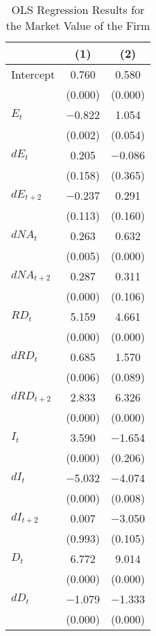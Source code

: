 {
\begin{longtable}{l*{2}{c}}
\caption{OLS Regression Results for the Market Value of the Firm \label{tab:6}}\\
\toprule\endfirsthead\midrule\endhead\midrule\endfoot\endlastfoot
&\multicolumn{1}{c}{(1)}&\multicolumn{1}{c}{(2)}\\
\midrule
Intercept   &       0.760&       0.580\\
&     (0.000)&     (0.000)\\
\addlinespace
$ E_{t}$    &    $-$0.822&       1.054\\
&     (0.002)&     (0.054)\\
\addlinespace
$ dE_{t}$   &       0.205&    $-$0.086\\
&     (0.158)&     (0.365)\\
\addlinespace
$ dE_{t+2}$ &    $-$0.237&       0.291\\
&     (0.113)&     (0.160)\\
\addlinespace
$ dNA_{t}$  &       0.263&       0.632\\
&     (0.005)&     (0.000)\\
\addlinespace
$ dNA_{t+2}$&       0.287&       0.311\\
&     (0.000)&     (0.106)\\
\addlinespace
$ RD_{t}$   &       5.159&       4.661\\
&     (0.000)&     (0.000)\\
\addlinespace
$ dRD_{t}$  &       0.685&       1.570\\
&     (0.006)&     (0.089)\\
\addlinespace
$ dRD_{t+2}$&       2.833&       6.326\\
&     (0.000)&     (0.000)\\
\addlinespace
$ I_{t}$    &       3.590&    $-$1.654\\
&     (0.000)&     (0.206)\\
\addlinespace
$ dI_{t}$   &    $-$5.032&    $-$4.074\\
&     (0.000)&     (0.008)\\
\addlinespace
$ dI_{t+2}$ &       0.007&    $-$3.050\\
&     (0.993)&     (0.105)\\
\addlinespace
$ D_{t}$    &       6.772&       9.014\\
&     (0.000)&     (0.000)\\
\addlinespace
$ dD_{t}$   &    $-$1.079&    $-$1.333\\
&     (0.000)&     (0.000)\\

\end{longtable}}

